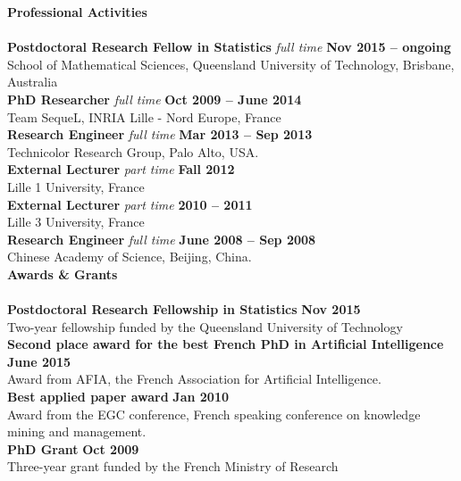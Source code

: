 \noindent\textbf{Professional Activities}\\[-.4cm]\noindent\makebox[\linewidth]{\rule{\columnwidth}{0.4pt}}\\[.1cm]
\noindent\textbf{Postdoctoral Research Fellow in Statistics} \textit{full time } \hfill \textbf{Nov 2015 -- ongoing} \\
School of Mathematical Sciences, Queensland University of Technology, Brisbane, Australia\\
\noindent\textbf{PhD Researcher} \textit{full time } \hfill \textbf{Oct 2009 -- June 2014}\\
Team SequeL, INRIA Lille - Nord Europe, France\\
\textbf{Research Engineer}  \textit{full time }  \hfill \textbf{ Mar 2013 -- Sep 2013}\\
Technicolor Research Group, Palo Alto, USA.\\
\textbf{External Lecturer} \textit{part time } \hfill \textbf{ Fall 2012}\\
Lille 1 University, France\\
\textbf{External Lecturer} \textit{part time }\hfill \textbf{2010 -- 2011  }\\
Lille 3 University, France\\ 
\textbf{Research Engineer}  \textit{full time }  \hfill \textbf{ June 2008 -- Sep 2008}\\
Chinese Academy of Science, Beijing, China.\\[.2cm] 

\noindent\textbf{Awards \& Grants}\\[-.4cm]\noindent\makebox[\linewidth]{\rule{\columnwidth}{0.4pt}}\\[.1cm]
\noindent\textbf{Postdoctoral Research Fellowship in Statistics} \hfill \textbf{Nov 2015} \\
Two-year fellowship funded by the Queensland University of Technology\\
\noindent\textbf{Second place award for the best French PhD in Artificial Intelligence }  \hfill \textbf{June 2015}\\
Award from AFIA, the French Association for Artificial Intelligence.\\
\textbf{Best applied paper award}  \hfill \textbf{ Jan 2010}\\
Award from the EGC conference, French speaking conference on knowledge mining and management.\\
\textbf{PhD Grant}  \hfill \textbf{ Oct 2009}\\
Three-year grant funded by the French Ministry of Research\\[.2cm]

